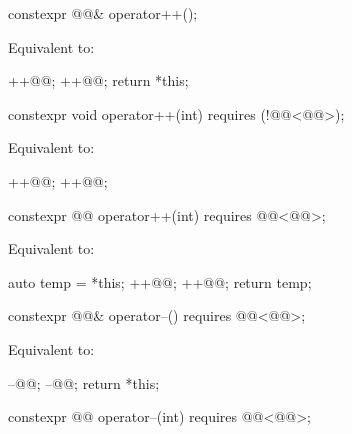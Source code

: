 \documentclass{wg21}
\begin{document}
\begin{addedblock}
\begin{itemdecl}
    constexpr @@& operator++();
\end{itemdecl}

\begin{itemdescr}
    \pnum
    \effects
    Equivalent to:
    \begin{codeblock}
        ++@@;
        ++@@;
        return *this;
    \end{codeblock}
\end{itemdescr}

\begin{itemdecl}
    constexpr void operator++(int) requires (!@@<@@>);
\end{itemdecl}

\begin{itemdescr}
    \pnum
    \effects
    Equivalent to:
    \begin{codeblock}
        ++@@;
        ++@@;
    \end{codeblock}
\end{itemdescr}

\begin{itemdecl}
    constexpr @@ operator++(int) requires @@<@@>;
\end{itemdecl}

\begin{itemdescr}
    \pnum
    \effects
    Equivalent to:
    \begin{codeblock}
        auto temp = *this;
        ++@@;
        ++@@;
        return temp;
    \end{codeblock}
\end{itemdescr}

\begin{itemdecl}
    constexpr @@& operator--() requires @@<@@>;
\end{itemdecl}

\begin{itemdescr}
    \pnum
    \effects
    Equivalent to:
    \begin{codeblock}
        --@@;
        --@@;
        return *this;
    \end{codeblock}
\end{itemdescr}

\begin{itemdecl}
    constexpr @@ operator--(int) requires @@<@@>;
\end{itemdecl}


\end{addedblock}
\end{document}
